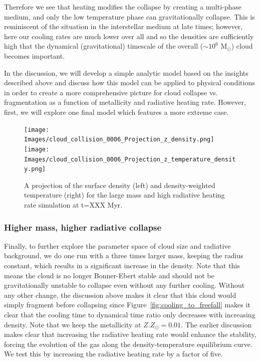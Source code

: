 \documentclass[useAMS,usenatbib]{mn2e}
\newcommand{\msun}{{M$_\odot$}}
\begin{document}
Therefore we see that heating modifies the collapse by creating a multi-phase medium, and only the low temperature phase can gravitationally collapse.  This is reminiscent of the situation in the interstellar medium at late times; however, here our cooling rates are much lower over all and so the densities are sufficiently high that the dynamical (gravitational) timescale of the overall ($\sim 10^6$ \msun) cloud becomes important.   

In the discussion, we will develop a simple analytic model based on the insights described above and discuss how this model can be applied to physical conditions in order to create a more comprehensive picture for cloud collapse vs. fragmentation as a function of metallicity and radiative heating rate.  However, first, we will explore one final model which features a more extreme case.

\begin{figure}
\begin{center}
\texttt{[image: Images/cloud\_collision\_0006\_Projection\_z\_density.png]}
\texttt{[image: Images/cloud\_collision\_0006\_Projection\_z\_temperature\_density.png]}
\end{center}
\caption{\label{fig:big_projections} A projection of the surface density (left) and density-weighted temperature (right) for the large mass and high radiative heating rate simulation at t=XXX Myr.}
\end{figure}

\subsubsection{Higher mass, higher radiative collapse}

Finally, to further explore the parameter space of cloud size and radiative background, we do one run with a three times larger mass, keeping the radius constant, which results in a significant increase in the density.  Note that this means the cloud is no longer Bonner-Ebert stable and should not be gravitationally unstable to collapse even without any further cooling.  Without any other change, the discussion above makes it clear that this cloud would simply fragment before collapsing since Figure~\ref{fig:cooling_to_freefall} makes it clear that the cooling time to dynamical time ratio only decreases with increasing density.  Note that we keep the metallicity at $Z.Z_{\odot}=0.01$.  The earlier discussion makes clear that increasing the radiative heating rate would enhance the stability, forcing the evolution of the gas along the density-temperature equilibrium curve.  We test this by increasing the radiative heating rate by a factor of five.
\end{document}
